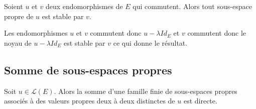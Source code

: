 \documentclass[french,11pt,twoside]{VcCours}
\begin{document}
\begin{Proposition}{} Soient $u$ et $v$ deux endomorphismes de $E$ qui commutent. Alors tout sous-espace propre de $u$ est stable par $v$.
\end{Proposition}

\begin{Demonstration}{} Les endomorphismes $u$ et $v$ commutent donc $u- \lambda Id_E$ et $v$ commutent donc le noyau de $u- \lambda Id_E$ est stable par $v$ ce qui donne le résultat.
\end{Demonstration}

\subsection{Somme de sous-espaces propres}

\begin{Proposition}{} Soit $u \in \mathcal{L}(E)$. Alors la somme d'une famille finie de sous-espaces propres associés à des valeurs propres deux à deux distinctes de $u$ est directe.
\end{Proposition}
\end{document}
